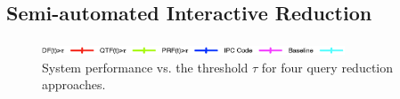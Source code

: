
\subsection{Semi-automated Interactive Reduction}

\label{sec:SemiAutomatedInteractiveReduction}

\begin{figure}[t!]
\begin{centering}
\includegraphics[width=9cm]{imgs/legend2}
\par\end{centering}

\begin{centering}
\par\end{centering}

\protect\caption{System performance vs. the threshold $\tau$ for four query reduction approaches.}
\label{fig:queryreduc}
\end{figure}

